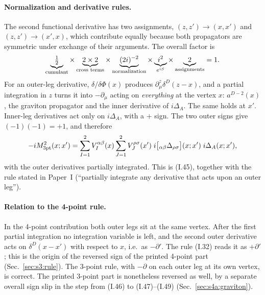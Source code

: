 \documentclass[aps,prd,onecolumn,10pt,nofootinbib,floatfix]{revtex4-2}
\newcommand{\PI}{Paper~I}
\newcommand{\eqI}[1]{(I.#1)}
\begin{document}
\paragraph*{Normalization and derivative rules.}
The second functional derivative has two assignments, $(z,z')\to(x,x')$ and $(z,z')\to(x',x)$, which
contribute equally because both propagators are symmetric under exchange of their arguments. The
overall factor is
\begin{equation}
\underbrace{\tfrac12}_{\rm cumulant}\times\underbrace{2\times2}_{\text{cross terms}}\times
\underbrace{(2i)^{-2}}_{\text{normalization}}\times\underbrace{i^2}_{e^{iS}}\times
\underbrace{2}_{\text{assignments}}=1 .
\label{eq:s4a:norm}
\end{equation}
For an outer-leg derivative, $\delta/\delta\Phi(x)$ produces $\partial^z_\mu\delta^D(z-x)$, and a partial
integration in $z$ turns it into $-\partial_\mu$ acting on \emph{everything} at the vertex $x$:
$a^{D-2}(x)$, the graviton propagator and the inner derivative of $i\Delta_A$. The same holds at $x'$.
Inner-leg derivatives act only on $i\Delta_A$, with a $+$ sign. The two outer signs give
$(-1)(-1)=+1$, and therefore
\begin{equation}
-iM^2_{\rm 3pt}(x;x')=\sum_{I=1}^2V_I^{\alpha\beta}(x)\sum_{J=1}^2V_J^{\rho\sigma}(x')\;
i\big[{}_{\alpha\beta}\Delta_{\rho\sigma}\big](x;x')\;i\Delta_A(x;x'),
\label{eq:s4a:45}
\end{equation}
with the outer derivatives partially integrated. This is \eqI{45}, together with the rule stated in
\PI{} (``partially integrate any derivative that acts upon an outer leg'').

\paragraph*{Relation to the 4-point rule.}
In the 4-point contribution both outer legs sit at the same vertex. After the first partial
integration no integration variable is left, and the second outer derivative acts on
$\delta^D(x-x')$ with respect to $x$, i.e.\ as $-\partial'$. The rule \eqI{32} reads it as $+\partial'$;
this is the origin of the reversed sign of the printed 4-point part (Sec.~\ref{sec:s3:rule}). The 3-point
rule, with $-\partial$ on each outer leg at its own vertex, is correct. The printed 3-point part is
nonetheless reversed as well, by a separate overall sign slip in the step from \eqI{46} to
\eqI{47}--\eqI{49} (Sec.~\ref{sec:s4a:graviton}).
\end{document}
